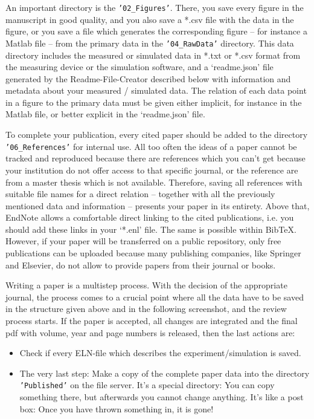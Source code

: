An important directory is the \texttt{'02\_Figures'}. There, you save every figure
in the manuscript in good quality, and you also save a *.csv file with the data
in the figure, or you save a file which generates the corresponding figure –
for instance a Matlab file – from the primary data in the \texttt{'04\_RawData'}
directory. This data directory includes the measured or simulated data in *.txt
or *.csv format from the measuring device or the simulation software, and a
`readme.json' file generated by the Readme-File-Creator described below with
information and metadata about your measured / simulated data. The relation of
each data point in a figure to the primary data must be given either implicit,
for instance in the Matlab file, or better explicit in the `readme.json' file.

To complete your publication, every cited paper should be added to the directory\\
\texttt{'06\_References'} for internal use. All too often the ideas of a paper
cannot be tracked and reproduced because there are references which you can’t
get because your institution do not offer access to that specific journal, or
the reference are from a master thesis which is not available. Therefore, saving
all references with suitable file names for a direct relation – together with
all the previously mentioned data and information – presents your paper in its
entirety. Above that, EndNote allows a comfortable direct linking to the cited
publications, i.e. you should add these links in your ‘*.enl’ file. The same is
possible within BibTeX. However, if your paper will be transferred on a public
repository, only free publications can be uploaded because many publishing
companies, like Springer and Elsevier, do not allow to provide papers from their
journal or books.

Writing a paper is a multistep process. With the decision of the appropriate
journal, the process comes to a crucial point where all the data have to be
saved in the structure given above and in the following screenshot, and the
review process starts. If the paper is accepted, all changes are integrated
and the final pdf with volume, year and page numbers is released, then the last
actions are:
\begin{itemize}
  \item Check if every ELN-file which describes the experiment/simulation
        is saved.
  \item The very last step: Make a copy of the complete paper data into the
        directory \texttt{’Published’} on the file server. It’s a special
        directory: You can copy something there, but afterwards you cannot
        change anything. It’s like a post box: Once you have thrown something
        in, it is gone!
\end{itemize}

